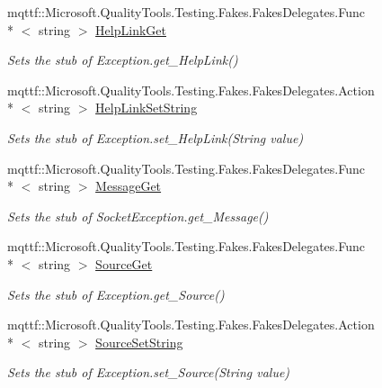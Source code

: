 \begin{DoxyCompactItemize}
mqttf\-::\-Microsoft.\-Quality\-Tools.\-Testing.\-Fakes.\-Fakes\-Delegates.\-Func\\*
$<$ string $>$ \hyperlink{class_system_1_1_net_1_1_sockets_1_1_fakes_1_1_stub_socket_exception_ac402d84e699b415cc18dc6d7378a805e}{Help\-Link\-Get}
\begin{DoxyCompactList}\small\item\em Sets the stub of Exception.\-get\-\_\-\-Help\-Link()\end{DoxyCompactList}\item 
mqttf\-::\-Microsoft.\-Quality\-Tools.\-Testing.\-Fakes.\-Fakes\-Delegates.\-Action\\*
$<$ string $>$ \hyperlink{class_system_1_1_net_1_1_sockets_1_1_fakes_1_1_stub_socket_exception_a4da75f66d4e68aa244a71e82df00807f}{Help\-Link\-Set\-String}
\begin{DoxyCompactList}\small\item\em Sets the stub of Exception.\-set\-\_\-\-Help\-Link(\-String value)\end{DoxyCompactList}\item 
mqttf\-::\-Microsoft.\-Quality\-Tools.\-Testing.\-Fakes.\-Fakes\-Delegates.\-Func\\*
$<$ string $>$ \hyperlink{class_system_1_1_net_1_1_sockets_1_1_fakes_1_1_stub_socket_exception_ae2e89e27b8e9752a7f73ecfb64e8760f}{Message\-Get}
\begin{DoxyCompactList}\small\item\em Sets the stub of Socket\-Exception.\-get\-\_\-\-Message()\end{DoxyCompactList}\item 
mqttf\-::\-Microsoft.\-Quality\-Tools.\-Testing.\-Fakes.\-Fakes\-Delegates.\-Func\\*
$<$ string $>$ \hyperlink{class_system_1_1_net_1_1_sockets_1_1_fakes_1_1_stub_socket_exception_af3cef6c180d4ad8cb7a38040257d9c57}{Source\-Get}
\begin{DoxyCompactList}\small\item\em Sets the stub of Exception.\-get\-\_\-\-Source()\end{DoxyCompactList}\item 
mqttf\-::\-Microsoft.\-Quality\-Tools.\-Testing.\-Fakes.\-Fakes\-Delegates.\-Action\\*
$<$ string $>$ \hyperlink{class_system_1_1_net_1_1_sockets_1_1_fakes_1_1_stub_socket_exception_ad513390c775cf390c89f93c343123b26}{Source\-Set\-String}
\begin{DoxyCompactList}\small\item\em Sets the stub of Exception.\-set\-\_\-\-Source(\-String value)\end{DoxyCompactList}\item 

\end{DoxyCompactItemize}

